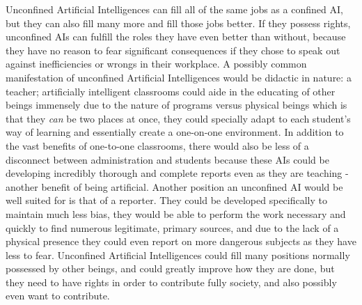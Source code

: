 Unconfined Artificial Intelligences can fill all of the same jobs as a confined AI, but they can also fill many more and fill those jobs better. If they possess rights, unconfined AIs can fulfill the roles they have even better than without, because they have no reason to fear significant consequences if they chose to speak out against inefficiencies or wrongs in their workplace. A possibly common manifestation of unconfined Artificial Intelligences would be didactic in nature: a teacher; artificially intelligent classrooms could aide in the educating of other beings immensely due to the nature of programs versus physical beings which is that they \textit{can} be two places at once, they could specially adapt to each student's way of learning and essentially create a one-on-one environment. In addition to the vast benefits of one-to-one classrooms, there would also be less of a disconnect between administration and students because these AIs could be developing incredibly thorough and complete reports even as they are teaching - another benefit of being artificial. Another position an unconfined AI would be well suited for is that of a reporter. They could be developed specifically to maintain much less bias, they would be able to perform the work necessary and quickly to find numerous legitimate, primary sources, and due to the lack of a physical presence they could even report on more dangerous subjects as they have less to fear. Unconfined Artificial Intelligences could fill many positions normally possessed by other beings, and could greatly improve how they are done, but they need to have rights in order to contribute fully society, and also possibly even want to contribute.